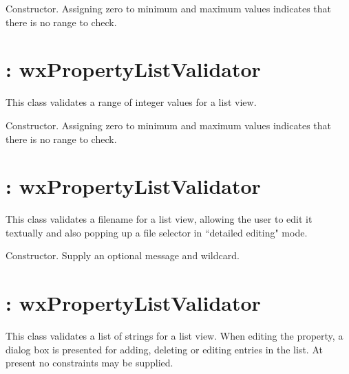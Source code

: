 
Constructor. Assigning zero to minimum and maximum values indicates that there is no range to check.


\section{: wxPropertyListValidator}\label{wxintegerlistvalidator}


This class validates a range of integer values for a list view.



Constructor. Assigning zero to minimum and maximum values indicates that there is no range to check.

\section{: wxPropertyListValidator}\label{wxfilenamelistvalidator}


This class validates a filename for a list view, allowing the user to edit it textually and also popping up
a file selector in ``detailed editing" mode.



Constructor. Supply an optional message and wildcard.

\section{: wxPropertyListValidator}\label{wxlistofstringslistvalidator}


This class validates a list of strings for a list view. When editing the property,
a dialog box is presented for adding, deleting or editing entries in the list.
At present no constraints may be supplied.

